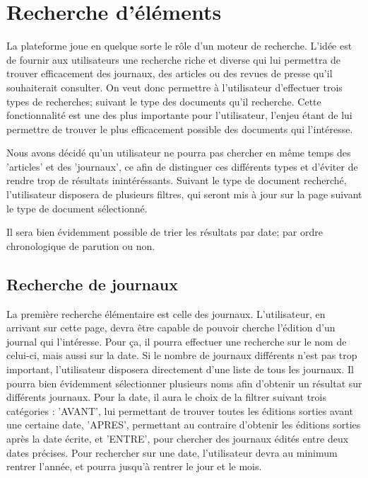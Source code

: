 \section{Recherche d'éléments}
\label{sec:recherche}

La plateforme joue en quelque sorte le rôle d'un moteur de recherche. L'idée est de fournir aux utilisateurs une recherche riche et diverse qui lui permettra de trouver efficacement des journaux, des articles ou des revues de presse qu'il souhaiterait consulter. On veut donc permettre à l'utilisateur d'effectuer trois types de recherches; suivant le type des documents qu'il recherche. Cette fonctionnalité est une des plus importante pour l'utilisateur, l'enjeu étant de lui permettre de trouver le plus efficacement possible des documents qui l'intéresse.

Nous avons décidé qu'un utilisateur ne pourra pas chercher en même temps des 'articles' et des 'journaux', ce afin de distinguer ces différents types et d'éviter de rendre trop de résultats inintéréssants. Suivant le type de document recherché, l'utilisateur disposera de plusieurs filtres, qui seront mis à jour sur la page suivant le type de document sélectionné.

Il sera bien évidemment possible de trier les résultats par date; par ordre chronologique de parution ou non.

\subsection{Recherche de journaux}
\label{sec:recherche_journal}

La première recherche élémentaire est celle des journaux. L'utilisateur, en arrivant sur cette page, devra être capable de pouvoir cherche l'édition d'un journal qui l'intéresse. Pour ça, il pourra effectuer une recherche sur le nom de celui-ci, mais aussi sur la date. Si le nombre de journaux différents n'est pas trop important, l'utilisateur disposera directement d'une liste de tous les journaux. Il pourra bien évidemment sélectionner plusieurs noms afin d'obtenir un résultat sur différents journaux. Pour la date, il aura le choix de la filtrer suivant trois catégories : 'AVANT', lui permettant de trouver toutes les éditions sorties avant une certaine date, 'APRES', permettant au contraire d'obtenir les éditions sorties après la date écrite, et 'ENTRE', pour chercher des journaux édités entre deux dates précises. Pour rechercher sur une date, l'utilisateur devra au minimum rentrer l'année, et pourra jusqu'à rentrer le jour et le mois.

